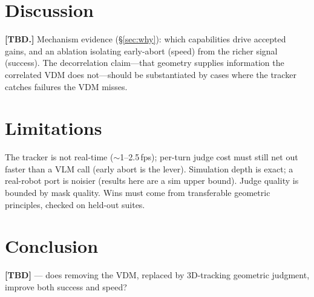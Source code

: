 \documentclass[11pt]{article}
\begin{document}
\section{Discussion}
\textbf{[TBD.]} Mechanism evidence (\S\ref{sec:why}): which capabilities drive accepted gains,
and an ablation isolating early-abort (speed) from the richer signal (success). The
decorrelation claim---that geometry supplies information the correlated VDM does not---should be
substantiated by cases where the tracker catches failures the VDM misses.

\section{Limitations}
The tracker is not real-time ($\sim$1--2.5\,fps); per-turn judge cost must still net out faster
than a VLM call (early abort is the lever). Simulation depth is exact; a real-robot port is
noisier (results here are a sim upper bound). Judge quality is bounded by mask quality. Wins
must come from transferable geometric principles, checked on held-out suites.

\section{Conclusion}
\textbf{[TBD]} --- does removing the VDM, replaced by 3D-tracking geometric judgment, improve
both success and speed?
\end{document}
